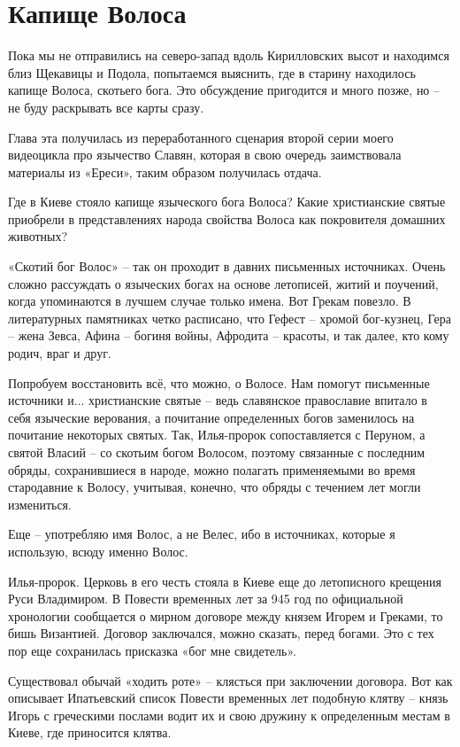 \chapter{Капище Волоса}

    Пока мы не отправились на северо-запад вдоль Кирилловских высот и находимся близ Щекавицы и Подола, попытаемся выяснить, где в старину находилось капище Волоса, скотьего бога. Это обсуждение пригодится и много позже, но – не буду раскрывать все карты сразу.

    Глава эта получилась из переработанного сценария второй серии моего видеоцикла про язычество Славян, которая в свою очередь заимствовала материалы из «Ереси», таким образом получилась отдача.

    Где в Киеве стояло капище языческого бога Волоса? Какие христианские святые приобрели в представлениях народа свойства Волоса как покровителя домашних животных?

   «Скотий бог Волос» – так он проходит в давних письменных источниках. Очень сложно рассуждать о языческих богах на основе летописей, житий и поучений, когда упоминаются в лучшем случае только имена. Вот Грекам повезло. В литературных памятниках четко расписано, что Гефест – хромой бог-кузнец, Гера – жена Зевса, Афина – богиня войны, Афродита – красоты, и так далее, кто кому родич, враг и друг.

Попробуем восстановить всё, что можно, о Волосе. Нам помогут письменные источники и... христианские святые – ведь славянское православие впитало в себя языческие верования, а почитание определенных богов заменилось на почитание некоторых святых. Так, Илья-пророк сопоставляется с Перуном, а святой Власий – со скотьим богом Волосом, поэтому связанные с последним обряды, сохранившиеся в народе, можно полагать применяемыми во время стародавние к Волосу, учитывая, конечно, что обряды с течением лет могли измениться.

Еще – употребляю имя Волос, а не Велес, ибо в источниках, которые я использую, всюду именно Волос.

Илья-пророк. Церковь в его честь стояла в Киеве еще до летописного крещения Руси Владимиром. В Повести временных лет за 945 год по официальной хронологии сообщается о мирном договоре между князем Игорем и Греками, то бишь Византией. Договор заключался, можно сказать, перед богами. Это с тех пор еще сохранилась присказка «бог мне свидетель».

Существовал обычай «ходить роте»  –  клясться при заключении договора. Вот как описывает Ипатьевский список Повести временных лет подобную клятву – князь Игорь с греческими послами водит их и свою дружину к определенным местам в Киеве, где приносится клятва.

